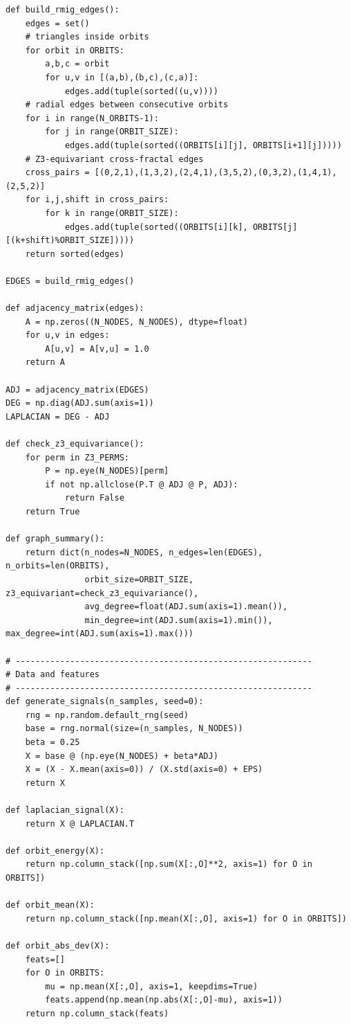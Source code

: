 \documentclass[11pt,a4paper]{report}
\begin{document}
\begin{lstlisting}[caption={Full Python script: RMIG-FBOHN and Meta-FBOHN suite},label={lst:rmig_fbohn_suite}]
def build_rmig_edges():
    edges = set()
    # triangles inside orbits
    for orbit in ORBITS:
        a,b,c = orbit
        for u,v in [(a,b),(b,c),(c,a)]:
            edges.add(tuple(sorted((u,v))))
    # radial edges between consecutive orbits
    for i in range(N_ORBITS-1):
        for j in range(ORBIT_SIZE):
            edges.add(tuple(sorted((ORBITS[i][j], ORBITS[i+1][j]))))
    # Z3-equivariant cross-fractal edges
    cross_pairs = [(0,2,1),(1,3,2),(2,4,1),(3,5,2),(0,3,2),(1,4,1),(2,5,2)]
    for i,j,shift in cross_pairs:
        for k in range(ORBIT_SIZE):
            edges.add(tuple(sorted((ORBITS[i][k], ORBITS[j][(k+shift)%ORBIT_SIZE]))))
    return sorted(edges)

EDGES = build_rmig_edges()

def adjacency_matrix(edges):
    A = np.zeros((N_NODES, N_NODES), dtype=float)
    for u,v in edges:
        A[u,v] = A[v,u] = 1.0
    return A

ADJ = adjacency_matrix(EDGES)
DEG = np.diag(ADJ.sum(axis=1))
LAPLACIAN = DEG - ADJ

def check_z3_equivariance():
    for perm in Z3_PERMS:
        P = np.eye(N_NODES)[perm]
        if not np.allclose(P.T @ ADJ @ P, ADJ):
            return False
    return True

def graph_summary():
    return dict(n_nodes=N_NODES, n_edges=len(EDGES), n_orbits=len(ORBITS),
                orbit_size=ORBIT_SIZE, z3_equivariant=check_z3_equivariance(),
                avg_degree=float(ADJ.sum(axis=1).mean()),
                min_degree=int(ADJ.sum(axis=1).min()), max_degree=int(ADJ.sum(axis=1).max()))

# ------------------------------------------------------------
# Data and features
# ------------------------------------------------------------
def generate_signals(n_samples, seed=0):
    rng = np.random.default_rng(seed)
    base = rng.normal(size=(n_samples, N_NODES))
    beta = 0.25
    X = base @ (np.eye(N_NODES) + beta*ADJ)
    X = (X - X.mean(axis=0)) / (X.std(axis=0) + EPS)
    return X

def laplacian_signal(X):
    return X @ LAPLACIAN.T

def orbit_energy(X):
    return np.column_stack([np.sum(X[:,O]**2, axis=1) for O in ORBITS])

def orbit_mean(X):
    return np.column_stack([np.mean(X[:,O], axis=1) for O in ORBITS])

def orbit_abs_dev(X):
    feats=[]
    for O in ORBITS:
        mu = np.mean(X[:,O], axis=1, keepdims=True)
        feats.append(np.mean(np.abs(X[:,O]-mu), axis=1))
    return np.column_stack(feats)


\end{lstlisting}
\end{document}
